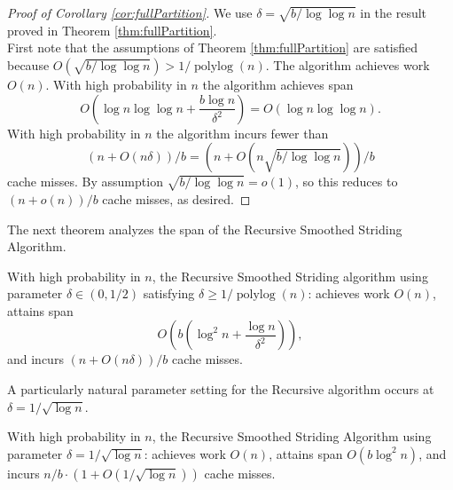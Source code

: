 \documentclass[twoside,leqno,twocolumn]{article}
\newcommand{\polylog}{\operatorname{polylog}}
\begin{document}
\begin{proof}[Proof of Corollary \ref{cor:fullPartition}] We use $\delta = \sqrt{b/\log\log n}$ in the result proved in Theorem \ref{thm:fullPartition}. \\
	First note that the assumptions of Theorem \ref{thm:fullPartition} are satisfied because $O(\sqrt{b/\log\log n}) > 1 / \polylog(n).$
	The algorithm achieves work $O(n)$. 
	With high probability in $n$ the algorithm achieves span 
$$O\left(\log n \log\log n +\frac{b\log n}{\delta^2}\right) = O(\log n\log\log n).$$
	With high probability in $n$ the algorithm incurs fewer than 
	$$(n+O(n\delta))/b = (n+O(n\sqrt{b/\log\log n}))/b$$ 
	cache misses.
	By assumption $\sqrt{b/\log\log n} = o(1)$, so this reduces to 
	$(n+o(n))/b$
	cache misses, as desired.
\end{proof}



The next theorem analyzes the span of the Recursive Smoothed Striding Algorithm.
\begin{theorem}
	\label{thm:groupedPartitionAlg}
	With high probability in $n$, the Recursive Smoothed Striding
        algorithm using parameter $\delta \in(0,1/2)$ satisfying
        $\delta \ge 1 / \polylog(n)$: achieves work $O(n)$, attains span
	$$O\left(b\left(\log^2 n + \frac{\log n}{\delta^2}\right)\right),$$
	and incurs $(n+O(n \delta))/b$ cache misses. 
\end{theorem}

A particularly natural parameter setting for the Recursive algorithm occurs at $\delta = 1 / \sqrt{\log n}$.
\begin{corollary}
  \label{cor:groupedPartitionAlg}
	With high probability in $n$, the Recursive Smoothed Striding Algorithm using parameter $\delta=1/\sqrt{\log n}$:
  achieves work $O(n)$, attains span $O(b\log^2 n)$, and incurs $n/b \cdot (1 + O(1 / \sqrt{\log n}))$ cache misses. 
\end{corollary}
\end{document}
